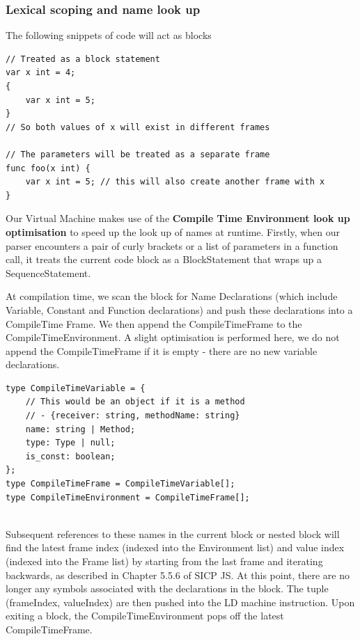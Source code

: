 \documentclass{report}
\begin{document}
\subsubsection{Lexical scoping and name look up} \label{section:cte-lookup}

The following snippets of code will act as blocks

\begin{verbatim}
// Treated as a block statement
var x int = 4;
{
    var x int = 5;
}
// So both values of x will exist in different frames

// The parameters will be treated as a separate frame
func foo(x int) { 
    var x int = 5; // this will also create another frame with x
}
\end{verbatim}

Our Virtual Machine makes use of the \textbf{Compile Time Environment look up optimisation} to speed up the look up of names at runtime. Firstly, when our parser encounters a pair of curly brackets or a list of parameters in a function call, it treats the current code block as a BlockStatement that wraps up a SequenceStatement.

At compilation time, we scan the block for Name Declarations (which include Variable, Constant and Function declarations) and push these declarations into a CompileTime Frame. We then append the CompileTimeFrame to the CompileTimeEnvironment. A slight optimisation is performed here, we do not append the CompileTimeFrame if it is empty - there are no new variable declarations.

\begin{verbatim}
type CompileTimeVariable = {
    // This would be an object if it is a method 
    // - {receiver: string, methodName: string}
    name: string | Method;
    type: Type | null;
    is_const: boolean;
};
type CompileTimeFrame = CompileTimeVariable[];
type CompileTimeEnvironment = CompileTimeFrame[];
    
\end{verbatim}

Subsequent references to these names in the current block or nested block will find the latest frame index (indexed into the Environment list) and value index (indexed into the Frame list) by starting from the last frame and iterating backwards, as described in Chapter 5.5.6 of SICP JS. At this point, there are no longer any symbols associated with the declarations in the block. The tuple (frameIndex, valueIndex) are then pushed into the LD machine instruction. Upon exiting a block, the CompileTimeEnvironment pops off the latest CompileTimeFrame.
\end{document}
